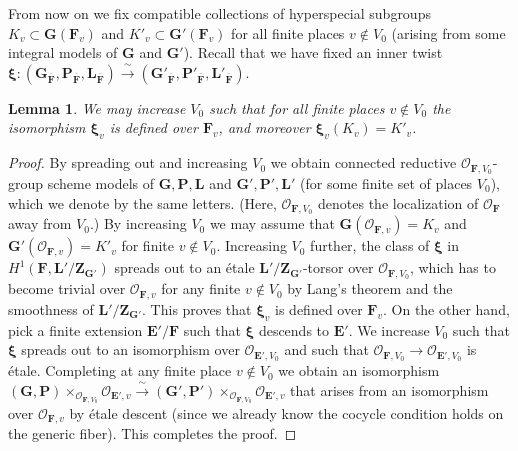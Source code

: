 \documentclass[a4paper]{amsart}
\numberwithin{equation}{section}
\newtheorem{lem}[thm]{Lemma}
\theoremstyle{remark}
\theoremstyle{definition}
\newcommand{\glob}[1]{\boldsymbol{#1}}
\newcommand{\congto}{\xrightarrow{\,\sim\,}}
\renewcommand{\o}[1]{\overline{#1}}
\begin{document}
From now on we fix compatible collections of hyperspecial subgroups $K_{v}\subset \glob{G}(\glob{F}_{v})$ and $K'_{v}\subset \glob{G}'(\glob{F}_{v})$ for all finite places $v \notin V_0$ (arising from some integral models of $\glob{G}$ and $\glob{G}'$).
Recall that we have fixed an inner twist $\glob{\xi} \colon (\glob{G}_{\o{\glob F}},\glob{P}_{\o{\glob F}},\glob{L}_{\o{\glob F}}) \congto (\glob{G}'_{\o{\glob F}},\glob{P}'_{\o{\glob F}},\glob{L}'_{\o{\glob F}})$.

\begin{lem}\label{lem:hyperspecial}
  We may increase $V_0$ such that for all finite places $v \notin V_0$ the isomorphism $\glob\xi_v$ is defined over $\glob{F}_v$, and moreover $\glob\xi_v(K_v) = K'_v$.
\end{lem}

\begin{proof}
  By spreading out and increasing $V_0$ we obtain connected reductive $\mathcal{O}_{\glob{F},V_0}$-group scheme models of $\glob{G}, \glob{P}, \glob{L}$ and $\glob{G}', \glob{P}', \glob{L}'$ (for some finite set of places $V_0$), which we denote by the same letters. 
  (Here, $\mathcal{O}_{\glob{F},V_0}$ denotes the localization of $\mathcal{O}_{\glob{F}}$ away from $V_0$.)
  By increasing $V_0$ we may assume that $\glob{G}(\mathcal{O}_{\glob{F},v}) = K_v$ and $\glob{G}'(\mathcal{O}_{\glob{F},v}) = K'_v$ for finite $v \notin V_0$.
  Increasing $V_0$ further, the class of $\glob\xi$ in $H^1(\glob{F},\glob{L}'/\glob{Z}_{\glob{G}'})$ spreads out to an \'etale $\glob{L}'/\glob{Z}_{\glob{G}'}$-torsor over $\mathcal{O}_{\glob{F},V_0}$, which has to become trivial over $\mathcal{O}_{\glob{F},v}$ for any finite $v \notin V_0$ by Lang's theorem and the smoothness of $\glob{L}'/\glob{Z}_{\glob{G}'}$.
  This proves that $\glob\xi_v$ is defined over $\glob{F}_v$. 
  On the other hand, pick a finite extension $\glob{E}'/\glob{F}$ such that $\glob\xi$ descends to $\glob{E}'$.
  We increase $V_0$ such that $\glob\xi$ spreads out to an isomorphism over $\mathcal{O}_{\glob{E}',V_0}$ and such that $\mathcal{O}_{\glob{F},V_0} \to \mathcal{O}_{\glob{E}',V_0}$ is \'etale.
  Completing at any finite place $v \notin V_0$ we obtain an isomorphism $(\glob{G},\glob{P}) \times_{\mathcal{O}_{\glob{F},V_0}} \mathcal{O}_{\glob{E}',v} \congto (\glob{G}',\glob{P}') \times_{\mathcal{O}_{\glob{F},V_0}} \mathcal{O}_{\glob{E}',v}$ that arises from an isomorphism over $\mathcal{O}_{\glob{F},v}$ by \'etale descent (since we already know the cocycle condition holds on the generic fiber).
  This completes the proof.
\end{proof}
\end{document}

